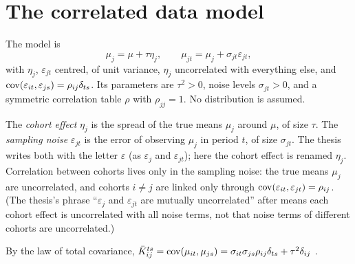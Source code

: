 \chapter{The correlated data model}\label{ch:model}

\begin{definition}\label{def:Model}
  \leanok
  The model  is
  \[
    \mu_j = \mu + \tau\eta_j, \qquad
    \mu_{jt} = \mu_j + \sigma_{jt}\varepsilon_{jt},
  \]
  with $\eta_j$, $\varepsilon_{jt}$ centred, of unit variance,
  $\eta_j$ uncorrelated with everything else, and
  $\operatorname{cov}(\varepsilon_{it}, \varepsilon_{js}) = \rho_{ij}\delta_{ts}$.
  Its parameters are $\tau^2 > 0$, noise levels $\sigma_{jt} > 0$, and a
  symmetric correlation table $\rho$ with $\rho_{jj} = 1$.
  No distribution is assumed.
\end{definition}

\begin{remark}\label{rem:notation}
  The \emph{cohort effect} $\eta_j$ is the spread of the true means
  $\mu_j$ around $\mu$, of size $\tau$. The \emph{sampling noise}
  $\varepsilon_{jt}$ is the error of observing $\mu_j$ in period $t$, of
  size $\sigma_{jt}$. The thesis  writes both with the letter
  $\varepsilon$ (as $\varepsilon_j$ and $\varepsilon_{jt}$); here the
  cohort effect is renamed $\eta_j$. Correlation between cohorts lives
  only in the sampling noise: the true means $\mu_j$ are uncorrelated,
  and cohorts $i \neq j$ are linked only through
  $\operatorname{cov}(\varepsilon_{it}, \varepsilon_{jt}) = \rho_{ij}$. (The thesis's
  phrase ``$\varepsilon_j$ and $\varepsilon_{jt}$ are mutually
  uncorrelated'' after  means each cohort effect is uncorrelated
  with all noise terms, not that noise terms of different cohorts are
  uncorrelated.)
\end{remark}

\begin{definition}\label{def:obsCov}
  \leanok
  By the law of total covariance,
  $\bar K_{ij}^{ts} = \operatorname{cov}(\mu_{it}, \mu_{js})
    = \sigma_{it}\sigma_{js}\rho_{ij}\delta_{ts} + \tau^2\delta_{ij}$
  .
\end{definition}

